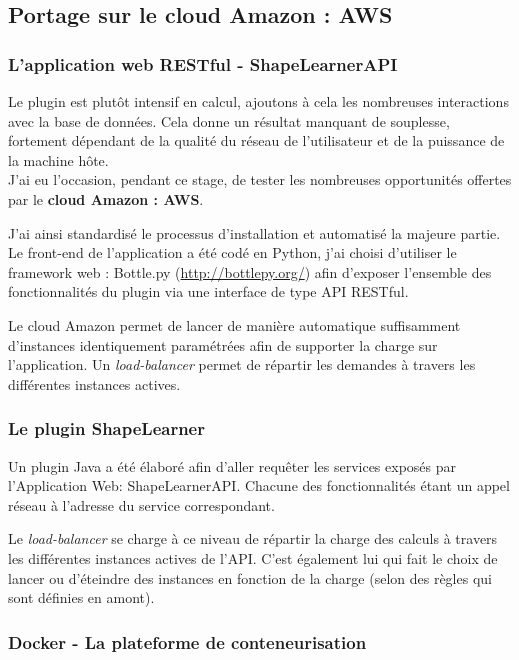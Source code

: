 \subsection{Portage sur le cloud Amazon : AWS}

\subsubsection{L'application web RESTful - ShapeLearnerAPI}

Le plugin est plutôt intensif en calcul, ajoutons à cela les nombreuses interactions avec la base de données. Cela donne un résultat manquant de souplesse, fortement dépendant de la qualité du réseau de l'utilisateur et de la puissance de la machine hôte.\\
J'ai eu l'occasion, pendant ce stage, de tester les nombreuses opportunités offertes par le \textbf{cloud Amazon : AWS}.

J'ai ainsi standardisé le processus d'installation et automatisé la majeure partie. Le front-end de l'application a été codé en Python, j'ai choisi d'utiliser le framework web : Bottle.py (\url{http://bottlepy.org/}) afin d'exposer l'ensemble des fonctionnalités du plugin via une interface de type API RESTful.

Le cloud Amazon permet de lancer de manière automatique suffisamment d'instances identiquement paramétrées afin de supporter la charge sur l'application. Un \textit{load-balancer} permet de répartir les demandes à travers les différentes instances actives.

\subsubsection{Le plugin ShapeLearner}

Un plugin Java a été élaboré afin d'aller requêter les services exposés par l'Application Web: ShapeLearnerAPI\-. Chacune des fonctionnalités étant un appel réseau à l'adresse du service correspondant. 

Le \textit{load-balancer} se charge à ce niveau de répartir la charge des calculs à travers les différentes instances actives de l'API. C'est également lui qui fait le choix de lancer ou d'éteindre des instances en fonction de la charge (selon des règles qui sont définies en amont).

\clearpage

\subsubsection{Docker - La plateforme de conteneurisation}

